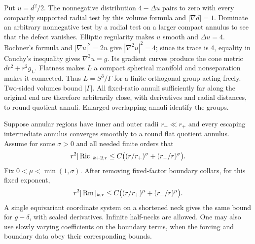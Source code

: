Put $u=d^2/2$. The nonnegative distribution $4-\Delta u$ pairs to zero
with every compactly supported radial test by this volume formula
and $|\nabla d|=1$. Dominate an arbitrary nonnegative test by a radial
test on a larger compact annulus to see that the defect vanishes.
Elliptic regularity makes $u$ smooth and $\Delta u=4$. Bochner's formula
and $|\nabla u|^2=2u$ give $|\nabla^2u|^2=4$; since its trace is $4$,
equality in Cauchy's inequality gives $\nabla^2u=g$. Its gradient
curves produce the cone metric $dr^2+r^2g_L$. Flatness makes $L$ a
compact spherical manifold and nonseparation makes it connected.
Thus $L=S^3/\Gamma$ for a finite orthogonal group acting freely.
Two-sided volumes bound $|\Gamma|$. All fixed-ratio annuli sufficiently
far along the original end are therefore arbitrarily close, with
derivatives and radial distances, to round quotient annuli.
Enlarged overlapping annuli identify the groups.

\begin{lemma}\label{geom:neck}
Suppose annular regions have inner and outer radii $r_-\ll r_+$ and
every escaping intermediate annulus converges smoothly to a round flat
quotient annulus. Assume for some $\sigma>0$ and all needed finite
orders that
\[
 r^2|\operatorname{Ric}|_{k+2,r}\leq
 C\big((r/r_+)^\sigma+(r_-/r)^\sigma\big).
\]
Fix $0<\mu<\min(1,\sigma)$. After removing fixed-factor boundary
collars, for this fixed exponent,
\begin{equation}\label{eq:neck-decay}
 r^2|\operatorname{Rm}|_{k,r}\leq
 C\big((r/r_+)^\mu+(r_-/r)^\mu\big).
\end{equation}
A single equivariant coordinate system on a shortened neck gives the
same bound for $g-\delta$, with scaled derivatives. Infinite
half-necks are allowed. One may also use slowly varying coefficients
on the boundary terms, when the forcing and boundary data obey their
corresponding bounds.
\end{lemma}

